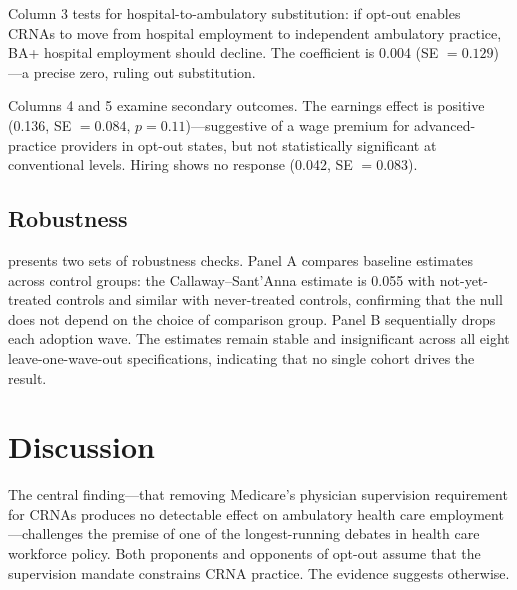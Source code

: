 \documentclass[12pt]{article}
\begin{document}
Column 3 tests for hospital-to-ambulatory substitution: if opt-out enables CRNAs to move from hospital employment to independent ambulatory practice, BA+ hospital employment should decline. The coefficient is 0.004 (SE $= 0.129$)---a precise zero, ruling out substitution.

Columns 4 and 5 examine secondary outcomes. The earnings effect is positive (0.136, SE $= 0.084$, $p = 0.11$)---suggestive of a wage premium for advanced-practice providers in opt-out states, but not statistically significant at conventional levels. Hiring shows no response (0.042, SE $= 0.083$).


\subsection{Robustness}



 presents two sets of robustness checks. Panel A compares baseline estimates across control groups: the Callaway--Sant'Anna estimate is 0.055 with not-yet-treated controls and similar with never-treated controls, confirming that the null does not depend on the choice of comparison group. Panel B sequentially drops each adoption wave. The estimates remain stable and insignificant across all eight leave-one-wave-out specifications, indicating that no single cohort drives the result.


\section{Discussion}

The central finding---that removing Medicare's physician supervision requirement for CRNAs produces no detectable effect on ambulatory health care employment---challenges the premise of one of the longest-running debates in health care workforce policy. Both proponents and opponents of opt-out assume that the supervision mandate constrains CRNA practice. The evidence suggests otherwise.
\end{document}
